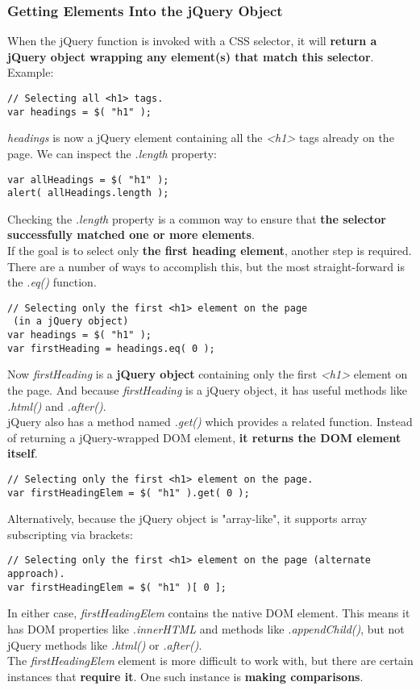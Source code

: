 \documentclass[10pt,letterpaper]{report}
\begin{document}
\subsubsection{Getting Elements Into the jQuery Object}
When the jQuery function is invoked with a CSS selector, it will \textbf{return a jQuery object wrapping any element(s) that match this selector}. Example:
\begin{lstlisting}
// Selecting all <h1> tags.
var headings = $( "h1" );
\end{lstlisting}
\textit{headings} is now a jQuery element containing all the \textit{<h1>} tags already on the page. We can inspect the \textit{.length} property:
\begin{lstlisting}
var allHeadings = $( "h1" );
alert( allHeadings.length );
\end{lstlisting}
Checking the \textit{.length} property is a common way to ensure that \textbf{the selector successfully matched one or more elements}.\\
If the goal is to select only \textbf{the first heading element}, another step is required. There are a number of ways to accomplish this, but the most straight-forward is the \textit{.eq()} function.
\begin{lstlisting}
// Selecting only the first <h1> element on the page
 (in a jQuery object)
var headings = $( "h1" );
var firstHeading = headings.eq( 0 );
\end{lstlisting}
Now \textit{firstHeading} is a \textbf{jQuery object} containing only the first \textit{<h1>} element on the page. And because \textit{firstHeading} is a jQuery object, it has useful methods like \textit{.html()} and \textit{.after()}.\\
jQuery also has a method named \textit{.get()} which provides a related function. Instead of returning a jQuery-wrapped DOM element, \textbf{it returns the DOM element itself}.
\begin{lstlisting}
// Selecting only the first <h1> element on the page.
var firstHeadingElem = $( "h1" ).get( 0 );
\end{lstlisting}
Alternatively, because the jQuery object is "array-like", it supports array subscripting via brackets:
\begin{lstlisting}
// Selecting only the first <h1> element on the page (alternate approach).
var firstHeadingElem = $( "h1" )[ 0 ];
\end{lstlisting}
In either case, \textit{firstHeadingElem} contains the native DOM element. This means it has DOM properties like \textit{.innerHTML} and methods like \textit{.appendChild()}, but not jQuery methods like \textit{.html()} or \textit{.after()}.\\
The \textit{firstHeadingElem} element is more difficult to work with, but there are certain instances that \textbf{require it}. One such instance is \textbf{making comparisons}.
\end{document}

